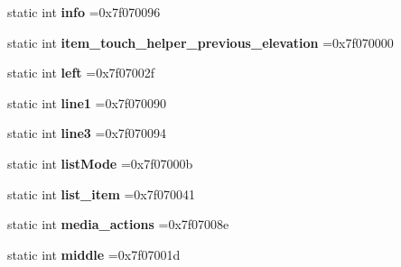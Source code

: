 \begin{DoxyCompactItemize}
static int {\bfseries info} =0x7f070096
\item 
\mbox{\label{classandroid_1_1support_1_1v7_1_1appcompat_1_1R_1_1id_a02068fdd8561e55100d21f4e228aab03}} 
static int {\bfseries item\+\_\+touch\+\_\+helper\+\_\+previous\+\_\+elevation} =0x7f070000
\item 
\mbox{\label{classandroid_1_1support_1_1v7_1_1appcompat_1_1R_1_1id_a5ab9fba142ad6c40368ed373edd9ffa9}} 
static int {\bfseries left} =0x7f07002f
\item 
\mbox{\label{classandroid_1_1support_1_1v7_1_1appcompat_1_1R_1_1id_a1a0553902b809526f9ee96e6a7ee72d6}} 
static int {\bfseries line1} =0x7f070090
\item 
\mbox{\label{classandroid_1_1support_1_1v7_1_1appcompat_1_1R_1_1id_af3ffa9f0e1513c95c41d4878a9f0ca99}} 
static int {\bfseries line3} =0x7f070094
\item 
\mbox{\label{classandroid_1_1support_1_1v7_1_1appcompat_1_1R_1_1id_af962f5ca8152ed307f0da2f2b9685760}} 
static int {\bfseries list\+Mode} =0x7f07000b
\item 
\mbox{\label{classandroid_1_1support_1_1v7_1_1appcompat_1_1R_1_1id_affda56760d8ed978ccf4ee95c7719286}} 
static int {\bfseries list\+\_\+item} =0x7f070041
\item 
\mbox{\label{classandroid_1_1support_1_1v7_1_1appcompat_1_1R_1_1id_aed03a914bc16694ab5cdf84708714fd7}} 
static int {\bfseries media\+\_\+actions} =0x7f07008e
\item 
\mbox{\label{classandroid_1_1support_1_1v7_1_1appcompat_1_1R_1_1id_af7a0986ca4a25a4ef0eb0b1f1ed634b7}} 
static int {\bfseries middle} =0x7f07001d
\item 
\mbox{\label{classandroid_1_1support_1_1v7_1_1appcompat_1_1R_1_1id_a4316afca48c9ffc94aec15c00506cd35}} 

\end{DoxyCompactItemize}
